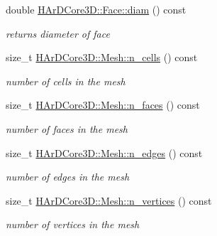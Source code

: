 \begin{DoxyCompactItemize}
\mbox{\label{group__Mesh_ga3303318a9f1465bf279617959644b01a}} 
double \hyperlink{group__Mesh_ga3303318a9f1465bf279617959644b01a}{H\+Ar\+D\+Core3\+D\+::\+Face\+::diam} () const
\begin{DoxyCompactList}\small\item\em returns diameter of face \end{DoxyCompactList}\item 
\mbox{\label{group__Mesh_ga60fb49998f950bad0659d1ac394d7cfd}} 
size\+\_\+t \hyperlink{group__Mesh_ga60fb49998f950bad0659d1ac394d7cfd}{H\+Ar\+D\+Core3\+D\+::\+Mesh\+::n\+\_\+cells} () const
\begin{DoxyCompactList}\small\item\em number of cells in the mesh \end{DoxyCompactList}\item 
\mbox{\label{group__Mesh_ga95cf99c07e92c81332fb534372ad7ff7}} 
size\+\_\+t \hyperlink{group__Mesh_ga95cf99c07e92c81332fb534372ad7ff7}{H\+Ar\+D\+Core3\+D\+::\+Mesh\+::n\+\_\+faces} () const
\begin{DoxyCompactList}\small\item\em number of faces in the mesh \end{DoxyCompactList}\item 
\mbox{\label{group__Mesh_ga145d728300f3cc4e156919ce635efdfc}} 
size\+\_\+t \hyperlink{group__Mesh_ga145d728300f3cc4e156919ce635efdfc}{H\+Ar\+D\+Core3\+D\+::\+Mesh\+::n\+\_\+edges} () const
\begin{DoxyCompactList}\small\item\em number of edges in the mesh \end{DoxyCompactList}\item 
\mbox{\label{group__Mesh_ga51e96fc91249453bf09268ec91839972}} 
size\+\_\+t \hyperlink{group__Mesh_ga51e96fc91249453bf09268ec91839972}{H\+Ar\+D\+Core3\+D\+::\+Mesh\+::n\+\_\+vertices} () const
\begin{DoxyCompactList}\small\item\em number of vertices in the mesh \end{DoxyCompactList}\item 
\mbox{\label{group__Mesh_gadb86f1eadf808e15e90881d626b467c0}} 

\end{DoxyCompactItemize}
